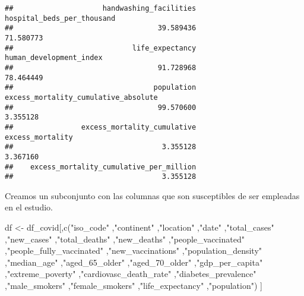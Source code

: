 \documentclass[
]{article}
\newenvironment{Shaded}{\begin{snugshade}}{\end{snugshade}}
\newcommand{\KeywordTok}[1]{\textcolor[rgb]{0.94,0.87,0.69}{#1}}
\newcommand{\NormalTok}[1]{\textcolor[rgb]{0.80,0.80,0.80}{#1}}
\newcommand{\StringTok}[1]{\textcolor[rgb]{0.80,0.58,0.58}{#1}}
\begin{document}
\begin{verbatim}
##                     handwashing_facilities                 hospital_beds_per_thousand 
##                                  39.589436                                  71.580773 
##                            life_expectancy                    human_development_index 
##                                  91.728968                                  78.464449 
##                                 population       excess_mortality_cumulative_absolute 
##                                  99.570600                                   3.355128 
##                excess_mortality_cumulative                           excess_mortality 
##                                   3.355128                                   3.367160 
##    excess_mortality_cumulative_per_million 
##                                   3.355128
\end{verbatim}

Creamos un subconjunto con las columnas que son susceptibles de ser
empleadas en el estudio.

\begin{Shaded}
\begin{Highlighting}[]
\NormalTok{df <-}\StringTok{ }\NormalTok{df_covid[,}\KeywordTok{c}\NormalTok{(}\StringTok{"iso_code"}
\NormalTok{                  ,}\StringTok{"continent"}
\NormalTok{                  ,}\StringTok{"location"}
\NormalTok{                  ,}\StringTok{"date"}
\NormalTok{                  ,}\StringTok{"total_cases"}
\NormalTok{                  ,}\StringTok{"new_cases"}
\NormalTok{                  ,}\StringTok{"total_deaths"}
\NormalTok{                  ,}\StringTok{"new_deaths"}
\NormalTok{                  ,}\StringTok{"people_vaccinated"}
\NormalTok{                  ,}\StringTok{"people_fully_vaccinated"}
\NormalTok{                  ,}\StringTok{"new_vaccinations"}
\NormalTok{                  ,}\StringTok{"population_density"}
\NormalTok{                  ,}\StringTok{"median_age"}
\NormalTok{                  ,}\StringTok{"aged_65_older"}
\NormalTok{                  ,}\StringTok{"aged_70_older"}
\NormalTok{                  ,}\StringTok{"gdp_per_capita"}
\NormalTok{                  ,}\StringTok{"extreme_poverty"}
\NormalTok{                  ,}\StringTok{"cardiovasc_death_rate"}
\NormalTok{                  ,}\StringTok{"diabetes_prevalence"}
\NormalTok{                  ,}\StringTok{"male_smokers"}
\NormalTok{                  ,}\StringTok{"female_smokers"}
\NormalTok{                  ,}\StringTok{"life_expectancy"}
\NormalTok{                  ,}\StringTok{"population"}\NormalTok{)}
\NormalTok{               ]}
\end{Highlighting}
\end{Shaded}
\end{document}

